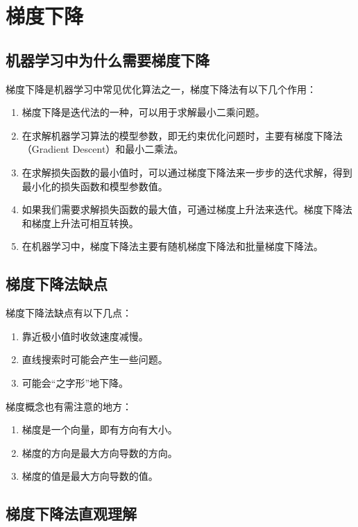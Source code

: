 \section{梯度下降}

\subsection{机器学习中为什么需要梯度下降}


梯度下降是机器学习中常见优化算法之一，梯度下降法有以下几个作用：

\begin{enumerate}
\itemsep0em
\item 梯度下降是迭代法的一种，可以用于求解最小二乘问题。
\item 在求解机器学习算法的模型参数，即无约束优化问题时，主要有梯度下降法（Gradient Descent）和最小二乘法。
\item 在求解损失函数的最小值时，可以通过梯度下降法来一步步的迭代求解，得到最小化的损失函数和模型参数值。
\item 如果我们需要求解损失函数的最大值，可通过梯度上升法来迭代。梯度下降法和梯度上升法可相互转换。
\item 在机器学习中，梯度下降法主要有随机梯度下降法和批量梯度下降法。
\end{enumerate}

\subsection{梯度下降法缺点}

梯度下降法缺点有以下几点：

\begin{enumerate}
\itemsep0em
\item 靠近极小值时收敛速度减慢。
\item 直线搜索时可能会产生一些问题。
\item 可能会``之字形''地下降。
\end{enumerate}

梯度概念也有需注意的地方：

\begin{enumerate}
\itemsep0em
\item 梯度是一个向量，即有方向有大小。
\item 梯度的方向是最大方向导数的方向。
\item 梯度的值是最大方向导数的值。
\end{enumerate}

\subsection{梯度下降法直观理解}

